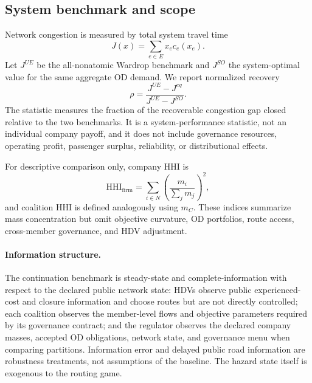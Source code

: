 \subsection{System benchmark and scope}\label{sec:model_metrics}

Network congestion is measured by total system travel time
\begin{equation}\label{eq:J}
 J(x)=\sum_{e\in E}x_ec_e(x_e).
\end{equation}
Let $J^{UE}$ be the all-nonatomic Wardrop benchmark and $J^{SO}$ the system-optimal value for the same aggregate OD demand. We report normalized recovery
\begin{equation}\label{eq:rho}
 \rho=\frac{J^{UE}-J^{eq}}{J^{UE}-J^{SO}}.
\end{equation}
The statistic measures the fraction of the recoverable congestion gap closed relative to the two benchmarks. It is a system-performance statistic, not an individual company payoff, and it does not include governance resources, operating profit, passenger surplus, reliability, or distributional effects.

For descriptive comparison only, company HHI is
\begin{equation}\label{eq:hhi}
 \mathrm{HHI}_{\mathrm{firm}}=\sum_{i\in N}\left(\frac{m_i}{\sum_jm_j}\right)^2,
\end{equation}
and coalition HHI is defined analogously using $m_C$. These indices summarize mass concentration but omit objective curvature, OD portfolios, route access, cross-member governance, and HDV adjustment.

\paragraph{Information structure.}
The continuation benchmark is steady-state and complete-information with respect to the declared public network state: HDVs observe public experienced-cost and closure information and choose routes but are not directly controlled; each coalition observes the member-level flows and objective parameters required by its governance contract; and the regulator observes the declared company masses, accepted OD obligations, network state, and governance menu when comparing partitions. Information error and delayed public road information are robustness treatments, not assumptions of the baseline. The hazard state itself is exogenous to the routing game.

